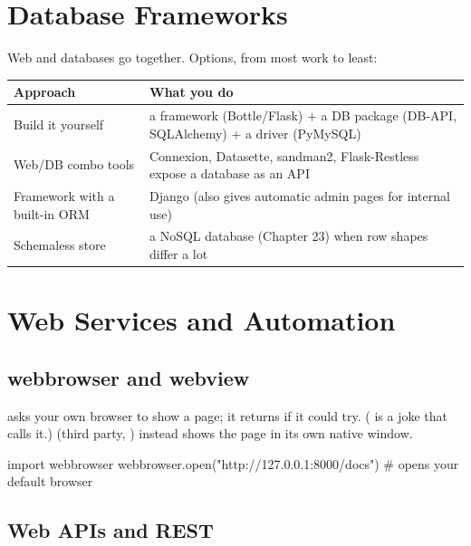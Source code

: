 \section{Database Frameworks}

Web and databases go together. Options, from most work to least:

\begin{center}
\begin{tabularx}{\linewidth}{@{}l X@{}}
\toprule
\textbf{Approach} & \textbf{What you do} \\
\midrule
Build it yourself & a framework (Bottle/Flask) + a DB package (DB-API, SQLAlchemy) + a driver (PyMySQL) \\
Web/DB combo tools & Connexion, Datasette, sandman2, Flask-Restless expose a database as an API \\
Framework with a built-in ORM & Django (also gives automatic admin pages for internal use) \\
Schemaless store & a NoSQL database (Chapter 23) when row shapes differ a lot \\
\bottomrule
\end{tabularx}
\end{center}

\section{Web Services and Automation}

\subsection{webbrowser and webview}

 asks your own browser to show a page; it returns  if it
could try. ( is a joke that calls it.)  (third party,
) instead shows the page in its own native window.

\begin{pycode}
import webbrowser
webbrowser.open("http://127.0.0.1:8000/docs")    # opens your default browser
\end{pycode}

\subsection{Web APIs and REST}

